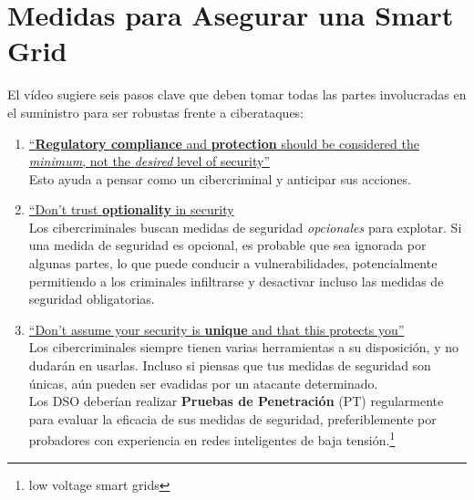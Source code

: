 \section{Medidas para Asegurar una Smart Grid}
El vídeo sugiere seis pasos clave que deben tomar todas las partes involucradas en el suministro para ser robustas frente a ciberataques:
\begin{enumerate}
   \item \ul{``\textbf{Regulatory compliance} and \textbf{protection} should be considered the \textit{minimum}, not the \textit{desired} level of security''}\\
   Esto ayuda a pensar como un cibercriminal y anticipar sus acciones.
   \item \ul{``Don't trust \textbf{optionality} in security}\\
   Los cibercriminales buscan medidas de seguridad \textit{opcionales} para explotar. Si una medida de seguridad es opcional, es probable que sea ignorada por algunas partes, lo que puede conducir a vulnerabilidades, potencialmente permitiendo a los criminales infiltrarse y desactivar incluso las medidas de seguridad obligatorias.
   \item \ul{``Don't assume your security is \textbf{unique} and that this protects you''}\\
   Los cibercriminales siempre tienen varias herramientas a su disposición, y no dudarán en usarlas. Incluso si piensas que tus medidas de seguridad son únicas, aún pueden ser evadidas por un atacante determinado.\\
   Los DSO deberían realizar \textbf{Pruebas de Penetración} (PT) regularmente para evaluar la eficacia de sus medidas de seguridad, preferiblemente por probadores con experiencia en redes inteligentes de baja tensión.\footnote{low voltage smart grids}

\end{enumerate}
